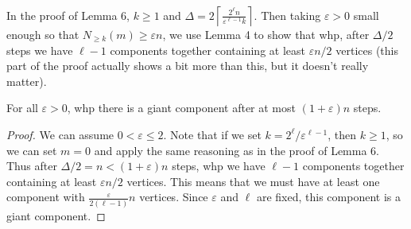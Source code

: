 \documentclass[twoside,10pt]{report}
\begin{document}

In the proof of Lemma 6, $k \geq 1$ and $\Delta= 2\left\lceil \frac{2^{\ell}n}{\varepsilon^{\ell-1}k} \right\rceil$. Then taking $\varepsilon>0$ small enough so that $N_{\geq k}(m) \geq \varepsilon n$, we use Lemma 4 to show that whp, after $\Delta/2$ steps we have $\ell-1$ components together containing at least $\varepsilon n /2$ vertices (this part of the proof actually shows a bit more than this, but it doesn't really matter).

\begin{prop}
	For all $\varepsilon>0$, whp there is a giant component after at most $(1+\varepsilon)n$ steps.
\end{prop}
\begin{proof}
	We can assume $0 < \varepsilon \leq 2$. Note that if we set $k = 2^{\ell}/\varepsilon^{\ell-1}$, then $k \geq 1$, so we can set $m=0$ and apply the same reasoning as in the proof of Lemma 6. Thus after $\Delta/2 = n < (1+\varepsilon)n$ steps, whp we have $\ell-1$ components together containing at least $\varepsilon n/2$ vertices. This means that we must have at least one component with $\frac{\varepsilon}{2(\ell-1)} n$ vertices. Since $\varepsilon$ and $\ell$ are fixed, this component is a giant component.
\end{proof}
\end{document}

